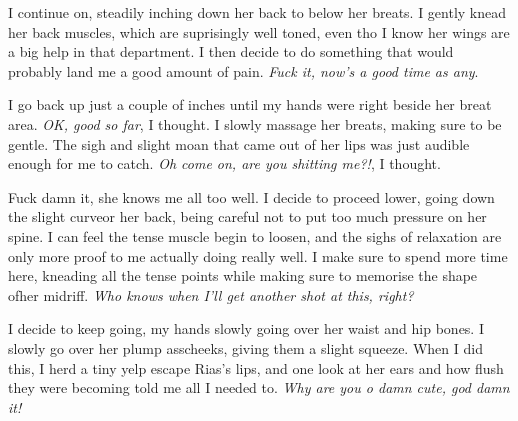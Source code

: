 \documentclass{article}
\begin{document}
I continue on, steadily inching down her back to below her breats. I gently knead her back muscles, which are suprisingly well toned, even tho I know her wings are a big help in that department. I then decide to do something that would probably land me a good amount of pain. \emph{Fuck it, now's a good time as any}.

I go back up just a couple of inches until my hands were right beside her breat area. \emph{OK, good so far}, I thought. I slowly massage her breats, making sure to be gentle. The sigh and slight moan that came out of her lips was just audible enough for me to catch. \emph{Oh come on, are you shitting me?!}, I thought.

Fuck damn it, she knows me all too well. I decide to proceed lower, going down the slight curveor her back, being careful not to put too much pressure on her spine. I can feel the tense muscle begin to loosen, and the sighs of relaxation are only more proof to me actually doing really well. I make sure to spend more time here, kneading all the tense points while making sure to memorise the shape ofher midriff. \emph{Who knows when I'll get another shot at this, right?}

I decide to keep going, my hands slowly going over her waist and hip bones. I slowly go over her plump asscheeks, giving them a slight squeeze. When I did this, I herd a tiny yelp escape Rias's lips, and one look at her ears and how flush they were becoming told me all I needed to. \emph{Why are you o damn cute, god damn it!}
\end{document}
